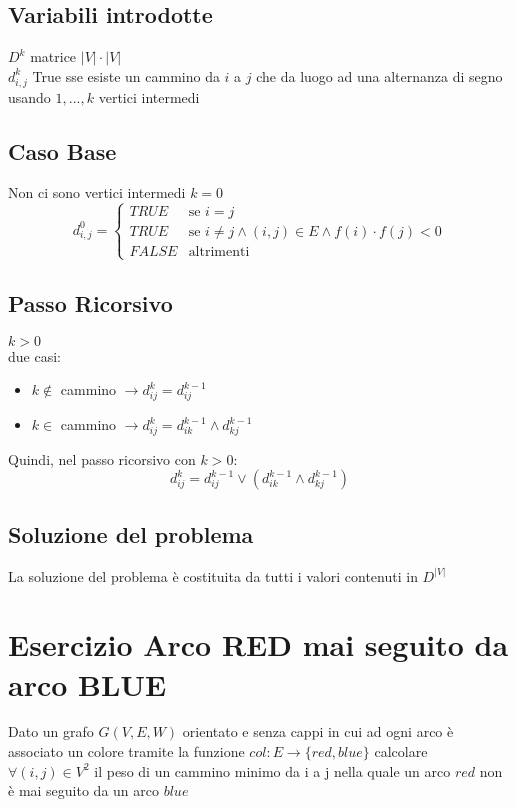 \documentclass[12pt, a4paper, openany]{book}
\begin{document}
\subsection*{Variabili introdotte}
$D^k$ matrice $|V|\cdot|V|$
\\$d^k_{i,j}$ True sse esiste un cammino da $i$ a $j$ che da luogo ad una alternanza di segno usando ${1,...,k}$ vertici intermedi

	\subsection*{Caso Base} Non ci sono vertici intermedi $k=0$
	\begin{equation*}
		d^0_{i,j} = \begin{cases}
			TRUE  & \text{se $i=j$}                                                  \\
			TRUE  & \text{se $i\neq j \land (i,j) \in E \land f(i) \cdot f(j) < 0 $} \\
			FALSE & \text{altrimenti}
		\end{cases}
	\end{equation*}

	\subsection*{Passo Ricorsivo} $k>0$\\
	due casi:
	\begin{itemize}
		\item $k\notin$ cammino $\rightarrow d^k_{ij} = d^{k-1}_{ij}$
		\item $k \in$ cammino $\rightarrow d^k_{ij} = d^{k-1}_{ik} \land d^{k-1}_{kj}$
	\end{itemize}
	Quindi, nel passo ricorsivo con $k>0$:
	\begin{equation*}
		d^k_{ij} = d^{k-1}_{ij} \lor  (d^{k-1}_{ik} \land d^{k-1}_{kj})
	\end{equation*}

	\subsection*{Soluzione del problema}
	La soluzione del problema è costituita da tutti i valori contenuti in $D^{|V|}$

	\section{Esercizio Arco RED mai seguito da arco BLUE}
	Dato un grafo $G(V,E,W)$ orientato e senza cappi in cui ad ogni arco è associato un colore tramite la funzione $col: E\rightarrow \{red,blue\}$
	calcolare $\forall (i,j) \in V^2$ il peso di un cammino minimo da i a j nella quale un arco $red$ non è mai seguito da un arco $blue$
\end{document}
